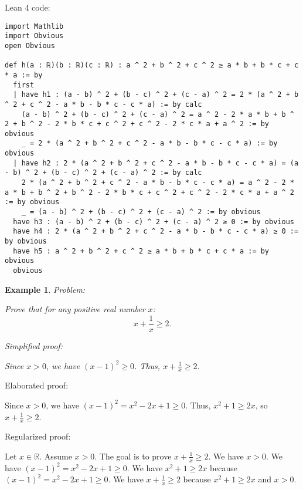 \documentclass{article}
\newtheorem{example}{Example}
\begin{document}
Lean 4 code:
\begin{tcolorbox}[colback=white!10, width=\linewidth]
\begin{lstlisting}[language=Lean4]
import Mathlib
import Obvious
open Obvious

def h(a : ℝ)(b : ℝ)(c : ℝ) : a ^ 2 + b ^ 2 + c ^ 2 ≥ a * b + b * c + c * a := by
  first
  | have h1 : (a - b) ^ 2 + (b - c) ^ 2 + (c - a) ^ 2 = 2 * (a ^ 2 + b ^ 2 + c ^ 2 - a * b - b * c - c * a) := by calc
    (a - b) ^ 2 + (b - c) ^ 2 + (c - a) ^ 2 = a ^ 2 - 2 * a * b + b ^ 2 + b ^ 2 - 2 * b * c + c ^ 2 + c ^ 2 - 2 * c * a + a ^ 2 := by obvious
    _ = 2 * (a ^ 2 + b ^ 2 + c ^ 2 - a * b - b * c - c * a) := by obvious
  | have h2 : 2 * (a ^ 2 + b ^ 2 + c ^ 2 - a * b - b * c - c * a) = (a - b) ^ 2 + (b - c) ^ 2 + (c - a) ^ 2 := by calc
    2 * (a ^ 2 + b ^ 2 + c ^ 2 - a * b - b * c - c * a) = a ^ 2 - 2 * a * b + b ^ 2 + b ^ 2 - 2 * b * c + c ^ 2 + c ^ 2 - 2 * c * a + a ^ 2 := by obvious
    _ = (a - b) ^ 2 + (b - c) ^ 2 + (c - a) ^ 2 := by obvious
  have h3 : (a - b) ^ 2 + (b - c) ^ 2 + (c - a) ^ 2 ≥ 0 := by obvious
  have h4 : 2 * (a ^ 2 + b ^ 2 + c ^ 2 - a * b - b * c - c * a) ≥ 0 := by obvious
  have h5 : a ^ 2 + b ^ 2 + c ^ 2 ≥ a * b + b * c + c * a := by obvious
  obvious

\end{lstlisting}
\end{tcolorbox}


\begin{example}
Problem:
\begin{tcolorbox}[colback=yellow!10, width=\linewidth]
Prove that for any positive real number $x$:
    $$x + \frac{1}{x} \geq 2.$$
\end{tcolorbox}

Simplified proof:
\begin{tcolorbox}[colback=blue!10, width=\linewidth]
Since $x>0$, we have $(x-1)^2 \ge 0$. Thus, $x + \frac{1}{x} \ge 2$.
\end{tcolorbox}
\end{example}

Elaborated proof:
\begin{tcolorbox}[colback=green!10, width=\linewidth]
Since $x>0$, we have $(x-1)^2 = x^2 - 2x + 1 \ge 0$. Thus, $x^2 + 1 \ge 2x$, so $x + \frac{1}{x} \ge 2$.
\end{tcolorbox}

Regularized proof:
\begin{tcolorbox}[colback=red!10, width=\linewidth]
Let $x\in\mathbb{R}$.
Assume $x > 0$.
The goal is to prove $x + \frac{1}{x} \ge 2$.
We have $x>0$.
We have ${(x-1)}^2 = x^2 - 2x + 1 \ge 0$.
We have $x^2 + 1 \ge 2x$ because ${(x-1)}^2 = x^2 - 2x + 1 \ge 0$.
We have $x + \frac{1}{x} \ge 2$ because $x^2 + 1 \ge 2x$ and $x>0$.
\end{tcolorbox}
\end{document}
